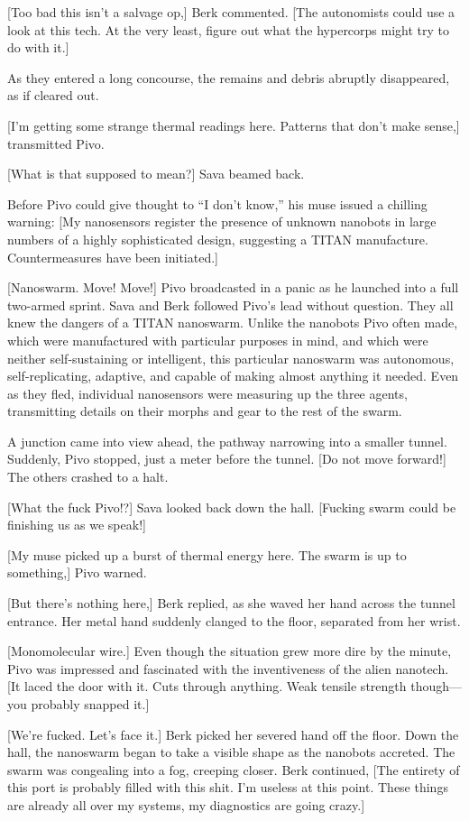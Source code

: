 [Too bad this isn't a salvage op,] Berk commented. [The autonomists could use a look at this tech. At the very least, figure out what the hypercorps might try to do with it.] 

As they entered a long concourse, the remains and debris abruptly disappeared, as if cleared out. 

[I'm getting some strange thermal readings here. Patterns that don't make sense,] transmitted Pivo. 

[What is that supposed to mean?] Sava beamed back. 

Before Pivo could give thought to ``I don't know,'' his muse issued a chilling warning: [My nanosensors register the presence of unknown nanobots in large numbers of a highly sophisticated design, suggesting a TITAN manufacture. Countermeasures have been initiated.] 

[Nanoswarm. Move! Move!] Pivo broadcasted in a panic as he launched into a full two-armed sprint. Sava and Berk followed Pivo's lead without question. They all knew the dangers of a TITAN nanoswarm. Unlike the nanobots Pivo often made, which were manufactured with particular purposes in mind, and which were neither self-sustaining or intelligent, this particular nanoswarm was autonomous, self-replicating, adaptive, and capable of making almost anything it needed. Even as they fled, individual nanosensors were measuring up the three agents, transmitting details on their morphs and gear to the rest of the swarm. 

A junction came into view ahead, the pathway narrowing into a smaller tunnel. Suddenly, Pivo stopped, just a meter before the tunnel. [Do not move forward!] The others crashed to a halt. 

[What the fuck Pivo!?] Sava looked back down the hall. [Fucking swarm could be finishing us as we speak!] 

[My muse picked up a burst of thermal energy here. The swarm is up to something,] Pivo warned. 

[But there's nothing here,] Berk replied, as she waved her hand across the tunnel entrance. Her metal hand suddenly clanged to the floor, separated from her wrist. 

[Monomolecular wire.] Even though the situation grew more dire by the minute, Pivo was impressed and fascinated with the inventiveness of the alien nanotech. [It laced the door with it. Cuts through anything. Weak tensile strength though—you probably snapped it.] 

[We're fucked. Let's face it.] Berk picked her severed hand off the floor. Down the hall, the nanoswarm began to take a visible shape as the nanobots accreted. The swarm was congealing into a fog, creeping closer. Berk continued, [The entirety of this port is probably filled with this shit. I'm useless at this point. These things are already all over my systems, my diagnostics are going crazy.] 

